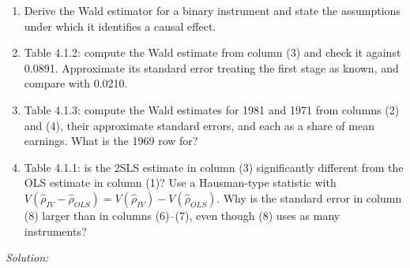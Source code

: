 \documentclass[11pt,a4paper]{article}
\newif\ifsolucoes
\newcommand{\espacoresol}{4.5cm}   %
\newcommand{\resolespaco}{\ifsolucoes\else\par\textit{Solution:}\vspace{\espacoresol}\par\fi}
\begin{document}
\begin{enumerate}[label=(\alph*)]
\item Derive the Wald estimator for a binary instrument and state the assumptions under which it
identifies a causal effect.
\item Table 4.1.2: compute the Wald estimate from column (3) and check it against 0.0891. Approximate its
standard error treating the first stage as known, and compare with 0.0210.
\item Table 4.1.3: compute the Wald estimates for 1981 and 1971 from columns (2) and (4), their approximate
standard errors, and each as a share of mean earnings. What is the 1969 row for?
\item Table 4.1.1: is the 2SLS estimate in column (3) significantly different from the OLS estimate in
column (1)? Use a Hausman-type statistic with $V(\hat\rho_{IV}-\hat\rho_{OLS})=V(\hat\rho_{IV})-V(\hat\rho_{OLS})$.
Why is the standard error in column (8) larger than in columns (6)--(7), even though (8) uses as many instruments?
\end{enumerate}
\resolespaco
\end{document}
